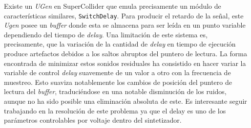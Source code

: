 Existe un \textit{UGen} en SuperCollider que emula precisamente un módulo de características similares, \texttt{SwitchDelay}. Para producir el retardo de la señal, este \textit{Ugen} posee un \textit{buffer} donde esta se almacena para ser leída en un punto variable dependiendo del tiempo de \textit{delay}. Una limitación de este sistema es, precisamente, que la variación de la cantidad de \textit{delay} en tiempo de ejecución produce artefactos debidos a los saltos abruptos del puntero de lectura. La forma encontrada de minimizar estos sonidos residuales ha consistido en hacer variar la variable de control \textit{delay} suavemente de un valor a otro con la frecuencia de muestreo. Esto suaviza notablemente los cambios de posición del puntero de lectura del \textit{buffer}, traduciéndose en una notable disminución de los ruidos, aunque no ha sido posible una eliminación absoluta de este. Es interesante seguir trabajando en la resolución de este problema ya que el delay es uno de los parámetros controlables por voltaje dentro del sintetizador.

